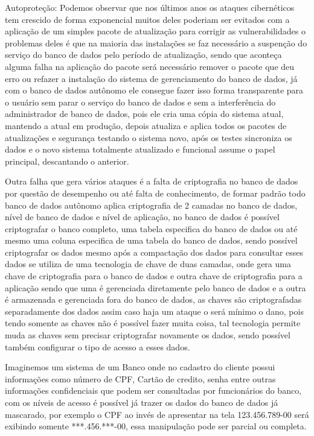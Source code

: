 \begin{alineas}
	
	\item Autoproteção: Podemos observar que nos últimos anos os ataques cibernéticos tem crescido de forma exponencial muitos deles poderiam ser evitados com a aplicação de um simples pacote de atualização para corrigir as vulnerabilidades o problemas deles é que na maioria das instalações se faz necessário a suspenção do serviço do banco de dados pelo período de atualização, sendo que aconteça alguma falha na aplicação do pacote será necessário remover o pacote que deu erro ou refazer a instalação do sistema de gerenciamento do banco de dados, já com o banco de dados autônomo ele consegue fazer isso forma transparente para o usuário sem parar o serviço do banco de dados e sem a interferência do administrador de banco de dados, pois ele cria uma cópia do sistema atual, mantendo a atual em produção, depois atualiza e aplica todos os pacotes de atualizações e segurança testando o sistema novo, após os testes sincroniza os dados e o novo sistema totalmente atualizado e funcional assume o papel principal, descantando o anterior.
	 
	Outra falha que gera vários ataques é a falta de criptografia no banco de dados por questão de desempenho ou até falta de conhecimento, de formar padrão todo banco de dados autônomo aplica criptografia de 2 camadas no banco de dados, nível de banco de dados e nível de aplicação, no banco de dados é possível criptografar o banco completo, uma tabela especifica do banco de dados ou até mesmo uma coluna especifica de uma tabela do banco de dados, sendo possível criptografar os dados mesmo após a compactação dos dados para consultar esses dados se utiliza de uma tecnologia de chave de duas camadas, onde gera uma chave de criptografia para o banco de dados e outra chave de criptografia para a aplicação sendo que uma é gerenciada diretamente pelo banco de dados e a outra é armazenada e gerenciada fora do banco de dados, as chaves são criptografadas separadamente dos dados assim caso haja um ataque o será mínimo o dano, pois tendo somente as chaves não é possível fazer muita coisa, tal tecnologia permite muda as chaves sem precisar criptografar novamente os dados, sendo possível também configurar o tipo de acesso a esses dados.
	
	Imaginemos um sistema de um Banco onde no cadastro do cliente possui informações como número de CPF, Cartão de credito, senha entre outras informações confidenciais que podem ser consultadas por funcionários do banco, com os níveis de acesso é possível já trazer os dados do banco de dados já mascarado, por exemplo o CPF ao invés de apresentar na tela 123.456.789-00 será exibindo somente ***.456.***-00, essa manipulação pode ser parcial ou completa.
	

\end{alineas}
